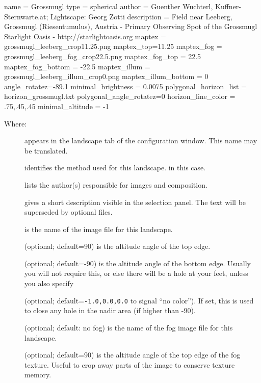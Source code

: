 \begin{configfile}
[landscape]
name = Grossmugl
type = spherical
author = Guenther Wuchterl, Kuffner-Sternwarte.at;
         Lightscape: Georg Zotti
description = Field near Leeberg, Grossmugl (Riesentumulus),
              Austria - Primary Observing Spot of the Grossmugl
              Starlight Oasis - http://starlightoasis.org
maptex = grossmugl_leeberg_crop11.25.png
maptex_top=11.25
maptex_fog = grossmugl_leeberg_fog_crop22.5.png
maptex_fog_top = 22.5
maptex_fog_bottom = -22.5
maptex_illum = grossmugl_leeberg_illum_crop0.png
maptex_illum_bottom = 0
angle_rotatez=-89.1
minimal_brightness = 0.0075
polygonal_horizon_list = horizon_grossmugl.txt
polygonal_angle_rotatez=0
horizon_line_color =  .75,.45,.45
minimal_altitude = -1
\end{configfile}
Where:
\begin{description}
\item[] appears in the landscape tab of the configuration window. This name may be translated.
\item[] identifies the method used for this
  landscape.  in this case.
\item[] lists the author(s) responsible for images and
  composition.
\item[] gives a short description visible in the
  selection panel. The text will be superseded by optional
   files.
\item[] is the name of the image file for this landscape.
\item[] (optional; default=90) is the altitude angle
  of the top edge.
\item[] (optional; default=-90) is the altitude
  angle of the bottom edge. Usually you will not require this, or else
  there will be a hole at your feet, unless you also specify
\item[] (optional;
  default=\texttt{-1.0,0.0,0.0} to signal ``no color''). If set, this
  is used to close any hole in the nadir area (if 
  higher than -90). 
\item[] (optional; default: no fog) is the name of
  the fog image file for this landscape.
\item[] (optional; default=90) is the altitude
  angle of the top edge of the fog texture. Useful to crop away parts
  of the image to conserve texture memory.

\end{description}
